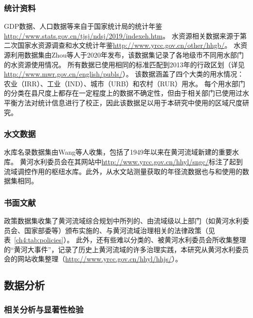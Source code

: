 

\subsubsection{统计资料}
GDP数据、人口数据等来自于国家统计局的统计年鉴\url{http://www.stats.gov.cn/tjsj/ndsj/2019/indexeh.htm}。
水资源相关数据来源于第二次国家水资源调查\cite{zhou2020}和水文统计年鉴\url{http://www.yrcc.gov.cn/other/hhgb/}。
水资源利用数据集由Zhou等人于2020年\cite{zhou2020}发布，该数据集记录了各地级市不同用水部门的水资源使用情况。
所有数据已使用相同的标准匹配到2013年的行政区划（详见\url{http://www.mwr.gov.cn/english/publs/}）。
该数据涵盖了四个大类的用水情况：农业（IRR）、工业（IND）、城市（URB）和农村（RUR）用水\cite{zhou2020}。
每个用水部门的分类在县尺度上都存在一定程度上的数据不确定性，但由于相关部门已使用过水平衡方法对统计信息进行了校正，因此该数据足以用于本研究中使用的区域尺度研究。

\subsubsection{水文数据}
水库名录数据集由Wang等人\cite{wang2019c}收集，包括了1949年以来在黄河流域新建的重要水库。
黄河水利委员会在其网站中\url{http://www.yrcc.gov.cn/hhyl/sngc/}标注了起到流域调控作用的枢纽水库。此外，从水文站测量获取的年径流数据也与\cite{wang2019c}和\cite{wang2016e}使用的数据集相同。

\subsubsection{书面文献}

政策数据集收集了黄河流域综合规划中所列的、由流域级以上部门（如黄河水利委员会、国家部委等）颁布实施的、与黄河流域治理相关的法律政策\cite{shuilibuhuangheshuiliweiyuanhui}（见表~\ref{ch4:tab:policies}）。
此外，还有些难以分类的、被黄河水利委员会所收集整理的“黄河大事件”，记录了历史上黄河流域的许多治理实践，本研究从黄河水利委员会的网站收集整理（\url{http://www.yrcc.gov.cn/hhyl/hhjs/}）。


\subsection{数据分析}

\subsubsection{相关分析与显著性检验}

